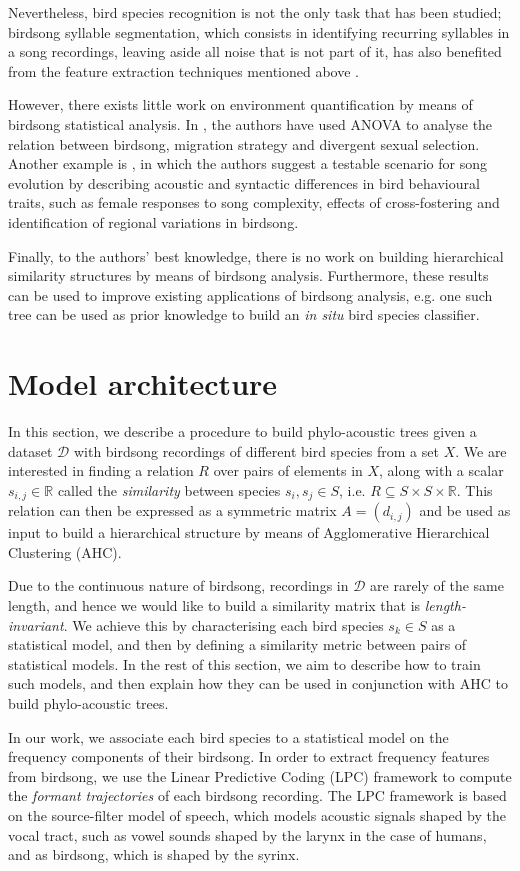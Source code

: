 \documentclass[pdftex,11pt,a4paper]{article}
\theoremstyle{definition}
\theoremstyle{remark}
\begin{document}
\par Nevertheless, bird species recognition is not the only task that has been studied; birdsong syllable segmentation, which consists in identifying recurring syllables in a song recordings, leaving aside all noise that is not part of it, has also benefited from the feature extraction techniques mentioned above \cite{Chou2008a}. 
\par However, there exists little work on environment quantification by means of birdsong statistical analysis. In \cite{Collins2009}, the authors have used ANOVA to analyse the relation between birdsong, migration strategy and divergent sexual selection. Another example is \cite{BolhuisJohanJ.andEveraertMartin2015}, in which the authors suggest a testable scenario for song evolution by describing acoustic and syntactic differences in bird behavioural traits, such as female responses to song complexity, effects of cross-fostering and identification of regional variations in birdsong.
\par Finally, to the authors' best knowledge, there is no work on building hierarchical similarity structures by means of birdsong analysis. Furthermore, these results can be used to improve existing applications of birdsong analysis, e.g. one such tree can be used as prior knowledge to build an \emph{in situ} bird species classifier.

\section{Model architecture}
\label{section_model}
In this section, we describe a procedure to build phylo-acoustic trees given a dataset $\mathcal{D}$ with birdsong recordings of different bird species from a set $X$. We are interested in finding a relation $R$ over pairs of elements in $X$, along with a scalar $s_{i, j} \in \mathbb{R}$ called the \emph{similarity} between species $s_i, s_j \in S$, i.e. $R \subseteq S \times S \times \mathbb{R}$. This relation can then be expressed as a symmetric matrix $A = (d_{i,j})$ and be used as input to build a hierarchical structure by means of Agglomerative Hierarchical Clustering (AHC). 
\par Due to the continuous nature of birdsong, recordings in $\mathcal{D}$ are rarely of the same length, and hence we would like to build a similarity matrix that is \emph{length-invariant}. We achieve this by characterising each bird species $s_k \in S$ as a statistical model, and then by defining a similarity metric between pairs of statistical models. In the rest of this section, we aim to describe how to train such models, and then explain how they can be used in conjunction with AHC to build phylo-acoustic trees.
\par In our work, we associate each bird species to a statistical model on the frequency components of their birdsong. In order to extract frequency features from birdsong, we use the Linear Predictive Coding (LPC) framework to compute the \emph{formant trajectories} of each birdsong recording. The LPC framework is based on the source-filter model of speech, which models acoustic signals shaped by the vocal tract, such as vowel sounds shaped by the larynx in the case of humans, and as birdsong, which is shaped by the syrinx.
\end{document}
